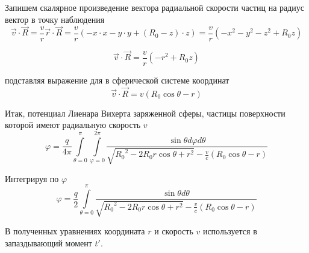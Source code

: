 ﻿\documentclass[12pt, letterpaper]{article}
\begin{document}
Запишем скалярное произведение вектора радиальной скорости частиц на радиус вектор в точку наблюдения
$$\overrightarrow{v}\cdot \overrightarrow{R}=\frac{v}{r}\overrightarrow{r}\cdot \overrightarrow{R}=\frac{v}{r}\left( -x\cdot x-y\cdot y+\left( {{R}_{0}}-z \right)\cdot z \right)=\frac{v}{r}\left( -{{x}^{2}}-{{y}^{2}}-{{z}^{2}}+{{R}_{0}}z \right)$$

$$\overrightarrow{v}\cdot \overrightarrow{R}=\frac{v}{r}\left( -{{r}^{2}}+{{R}_{0}}z \right)$$

подставляя выражение для в сферической системе координат
	$$\overrightarrow{v}\cdot \overrightarrow{R}=v\left( {{R}_{0}}\cos \theta -r \right)$$

Итак, потенциал Лиенара Вихерта заряженной сферы, частицы поверхности которой имеют радиальную скорость $v$ 
	\[\varphi =\frac{q}{4\pi }\int\limits_{\theta =0}^{\pi }{\int\limits_{\varphi =0}^{2\pi }{\frac{\sin \theta d\varphi d\theta }{\sqrt{{{R}_{0}}^{2}-2{{R}_{0}}r\cos \theta +{{r}^{2}}}-\frac{v}{c}\left( {{R}_{0}}\cos \theta -r \right)}}}\] 	

Интегрируя по $\varphi $ 
	\[\varphi =\frac{q}{2}\int\limits_{\theta =0}^{\pi }{\frac{\sin \theta d\theta }{\sqrt{{{R}_{0}}^{2}-2{{R}_{0}}r\cos \theta +{{r}^{2}}}-\frac{v}{c}\left( {{R}_{0}}\cos \theta -r \right)}}\]

В полученных уравнениях координата $r$ и скорость $v$ используется в запаздывающий момент $t'$.




\end{document}
